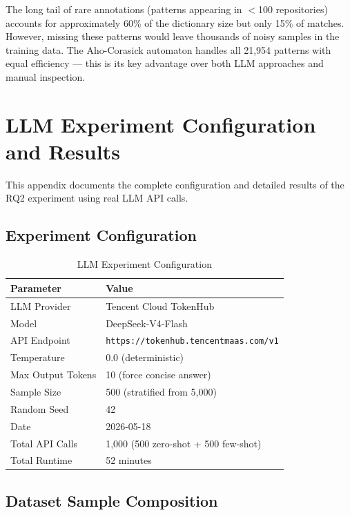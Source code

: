 \documentclass[acmlarge,nonacm,screen]{acmart}
\begin{document}
The long tail of rare annotations (patterns appearing in $<$100 repositories) accounts for approximately 60\% of the dictionary size but only 15\% of matches. However, missing these patterns would leave thousands of noisy samples in the training data. The Aho-Corasick automaton handles all 21,954 patterns with equal efficiency --- this is its key advantage over both LLM approaches and manual inspection.


\section{LLM Experiment Configuration and Results}
\label{appendix:llm-experiment}

This appendix documents the complete configuration and detailed results of the RQ2 experiment using real LLM API calls.

\subsection{Experiment Configuration}

\begin{table}[H]
\caption{LLM Experiment Configuration}
\label{tab:llm-config}
\begin{tabular}{@{}ll@{}}
\toprule
\textbf{Parameter} & \textbf{Value} \\
\midrule
LLM Provider & Tencent Cloud TokenHub \\
Model & DeepSeek-V4-Flash \\
API Endpoint & \texttt{https://tokenhub.tencentmaas.com/v1} \\
Temperature & 0.0 (deterministic) \\
Max Output Tokens & 10 (force concise answer) \\
Sample Size & 500 (stratified from 5,000) \\
Random Seed & 42 \\
Date & 2026-05-18 \\
Total API Calls & 1,000 (500 zero-shot + 500 few-shot) \\
Total Runtime & 52 minutes \\
\bottomrule
\end{tabular}
\end{table}

\subsection{Dataset Sample Composition}
\end{document}
